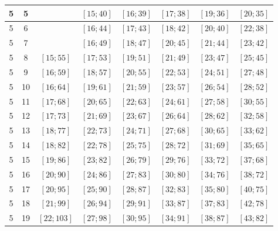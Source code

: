 \documentclass[a4paper,12pt]{article}
\begin{document}
\begin{center}
{\begin{longtable}[H]{|c|c|c|c|c|c|c|c|}
5 &  5 &   &  $\left[ 15; 40\right]$ &  $\left[ 16; 39\right]$ &  $\left[ 17; 38\right]$ &  $\left[ 19; 36\right]$ &  $\left[ 20; 35\right]$ \tabularnewline \hline
5 &  6 &   &  $\left[ 16; 44\right]$ &  $\left[ 17; 43\right]$ &  $\left[ 18; 42\right]$ &  $\left[ 20; 40\right]$ &  $\left[ 22; 38\right]$ \tabularnewline \hline
5 &  7 &   &  $\left[ 16; 49\right]$ &  $\left[ 18; 47\right]$ &  $\left[ 20; 45\right]$ &  $\left[ 21; 44\right]$ &  $\left[ 23; 42\right]$ \tabularnewline \hline
5 &  8 &  $\left[ 15; 55\right]$ &  $\left[ 17; 53\right]$ &  $\left[ 19; 51\right]$ &  $\left[ 21; 49\right]$ &  $\left[ 23; 47\right]$ &  $\left[ 25; 45\right]$ \tabularnewline \hline
5 &  9 &  $\left[ 16; 59\right]$ &  $\left[ 18; 57\right]$ &  $\left[ 20; 55\right]$ &  $\left[ 22; 53\right]$ &  $\left[ 24; 51\right]$ &  $\left[ 27; 48\right]$ \tabularnewline \hline
5 &  10 &  $\left[ 16; 64\right]$ &  $\left[ 19; 61\right]$ &  $\left[ 21; 59\right]$ &  $\left[ 23; 57\right]$ &  $\left[ 26; 54\right]$ &  $\left[ 28; 52\right]$ \tabularnewline \hline
5 &  11 &  $\left[ 17; 68\right]$ &  $\left[ 20; 65\right]$ &  $\left[ 22; 63\right]$ &  $\left[ 24; 61\right]$ &  $\left[ 27; 58\right]$ &  $\left[ 30; 55\right]$ \tabularnewline \hline
5 &  12 &  $\left[ 17; 73\right]$ &  $\left[ 21; 69\right]$ &  $\left[ 23; 67\right]$ &  $\left[ 26; 64\right]$ &  $\left[ 28; 62\right]$ &  $\left[ 32; 58\right]$ \tabularnewline \hline
5 &  13 &  $\left[ 18; 77\right]$ &  $\left[ 22; 73\right]$ &  $\left[ 24; 71\right]$ &  $\left[ 27; 68\right]$ &  $\left[ 30; 65\right]$ &  $\left[ 33; 62\right]$ \tabularnewline \hline
5 &  14 &  $\left[ 18; 82\right]$ &  $\left[ 22; 78\right]$ &  $\left[ 25; 75\right]$ &  $\left[ 28; 72\right]$ &  $\left[ 31; 69\right]$ &  $\left[ 35; 65\right]$ \tabularnewline \hline
5 &  15 &  $\left[ 19; 86\right]$ &  $\left[ 23; 82\right]$ &  $\left[ 26; 79\right]$ &  $\left[ 29; 76\right]$ &  $\left[ 33; 72\right]$ &  $\left[ 37; 68\right]$ \tabularnewline \hline
5 &  16 &  $\left[ 20; 90\right]$ &  $\left[ 24; 86\right]$ &  $\left[ 27; 83\right]$ &  $\left[ 30; 80\right]$ &  $\left[ 34; 76\right]$ &  $\left[ 38; 72\right]$ \tabularnewline \hline
5 &  17 &  $\left[ 20; 95\right]$ &  $\left[ 25; 90\right]$ &  $\left[ 28; 87\right]$ &  $\left[ 32; 83\right]$ &  $\left[ 35; 80\right]$ &  $\left[ 40; 75\right]$ \tabularnewline \hline
5 &  18 &  $\left[ 21; 99\right]$ &  $\left[ 26; 94\right]$ &  $\left[ 29; 91\right]$ &  $\left[ 33; 87\right]$ &  $\left[ 37; 83\right]$ &  $\left[ 42; 78\right]$ \tabularnewline \hline
5 &  19 &  $\left[ 22; 103\right]$ &  $\left[ 27; 98\right]$ &  $\left[ 30; 95\right]$ &  $\left[ 34; 91\right]$ &  $\left[ 38; 87\right]$ &  $\left[ 43; 82\right]$ \tabularnewline \hline

\end{longtable}}
\end{center}
\end{document}
